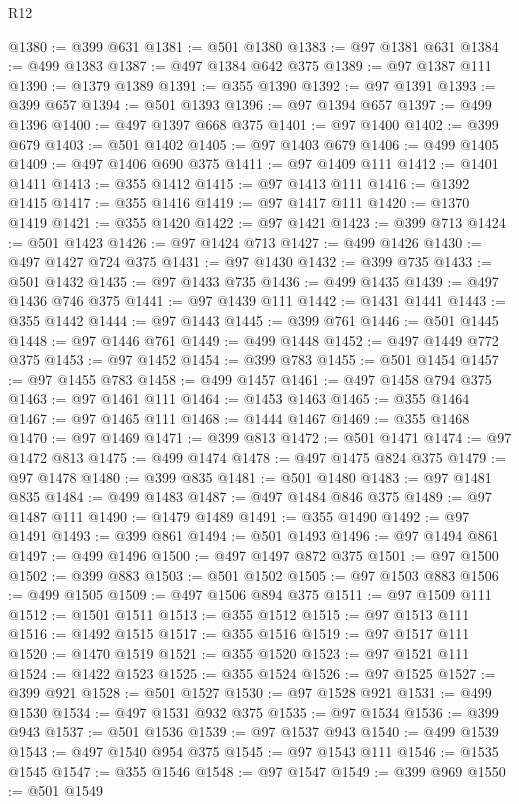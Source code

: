 \begin{lexlean}{R12}
\begin{coremodule}
{{{{{{{{{{{{{{{{{{{{{{{{{{{{{{{{{{{{{{{{{{{{{{{{{{{{{{{{{{{{{{{{{{{{{{{{{{{{{{{{{{@1380 := @399 @631
@1381 := @501 @1380
@1383 := @97 @1381 @631
@1384 := @499 @1383
@1387 := @497 @1384 @642 @375
@1389 := @97 @1387 @111
@1390 := @1379 @1389
@1391 := @355 @1390
@1392 := @97 @1391
@1393 := @399 @657
@1394 := @501 @1393
@1396 := @97 @1394 @657
@1397 := @499 @1396
@1400 := @497 @1397 @668 @375
@1401 := @97 @1400
@1402 := @399 @679
@1403 := @501 @1402
@1405 := @97 @1403 @679
@1406 := @499 @1405
@1409 := @497 @1406 @690 @375
@1411 := @97 @1409 @111
@1412 := @1401 @1411
@1413 := @355 @1412
@1415 := @97 @1413 @111
@1416 := @1392 @1415
@1417 := @355 @1416
@1419 := @97 @1417 @111
@1420 := @1370 @1419
@1421 := @355 @1420
@1422 := @97 @1421
@1423 := @399 @713
@1424 := @501 @1423
@1426 := @97 @1424 @713
@1427 := @499 @1426
@1430 := @497 @1427 @724 @375
@1431 := @97 @1430
@1432 := @399 @735
@1433 := @501 @1432
@1435 := @97 @1433 @735
@1436 := @499 @1435
@1439 := @497 @1436 @746 @375
@1441 := @97 @1439 @111
@1442 := @1431 @1441
@1443 := @355 @1442
@1444 := @97 @1443
@1445 := @399 @761
@1446 := @501 @1445
@1448 := @97 @1446 @761
@1449 := @499 @1448
@1452 := @497 @1449 @772 @375
@1453 := @97 @1452
@1454 := @399 @783
@1455 := @501 @1454
@1457 := @97 @1455 @783
@1458 := @499 @1457
@1461 := @497 @1458 @794 @375
@1463 := @97 @1461 @111
@1464 := @1453 @1463
@1465 := @355 @1464
@1467 := @97 @1465 @111
@1468 := @1444 @1467
@1469 := @355 @1468
@1470 := @97 @1469
@1471 := @399 @813
@1472 := @501 @1471
@1474 := @97 @1472 @813
@1475 := @499 @1474
@1478 := @497 @1475 @824 @375
@1479 := @97 @1478
@1480 := @399 @835
@1481 := @501 @1480
@1483 := @97 @1481 @835
@1484 := @499 @1483
@1487 := @497 @1484 @846 @375
@1489 := @97 @1487 @111
@1490 := @1479 @1489
@1491 := @355 @1490
@1492 := @97 @1491
@1493 := @399 @861
@1494 := @501 @1493
@1496 := @97 @1494 @861
@1497 := @499 @1496
@1500 := @497 @1497 @872 @375
@1501 := @97 @1500
@1502 := @399 @883
@1503 := @501 @1502
@1505 := @97 @1503 @883
@1506 := @499 @1505
@1509 := @497 @1506 @894 @375
@1511 := @97 @1509 @111
@1512 := @1501 @1511
@1513 := @355 @1512
@1515 := @97 @1513 @111
@1516 := @1492 @1515
@1517 := @355 @1516
@1519 := @97 @1517 @111
@1520 := @1470 @1519
@1521 := @355 @1520
@1523 := @97 @1521 @111
@1524 := @1422 @1523
@1525 := @355 @1524
@1526 := @97 @1525
@1527 := @399 @921
@1528 := @501 @1527
@1530 := @97 @1528 @921
@1531 := @499 @1530
@1534 := @497 @1531 @932 @375
@1535 := @97 @1534
@1536 := @399 @943
@1537 := @501 @1536
@1539 := @97 @1537 @943
@1540 := @499 @1539
@1543 := @497 @1540 @954 @375
@1545 := @97 @1543 @111
@1546 := @1535 @1545
@1547 := @355 @1546
@1548 := @97 @1547
@1549 := @399 @969
@1550 := @501 @1549
}}}}}}}}}}}}}}}}}}}}}}}}}}}}}}}}}}}}}}}}}}}}}}}}}}}}}}}}}}}}}}}}}}}}}}}}}}}}}}}}}}
\end{coremodule}
\end{lexlean}
